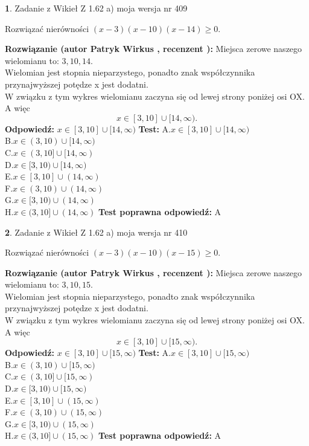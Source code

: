 \documentclass[12pt, a4paper]{article}
\theoremstyle{definition} %
\newtheorem{zad}{}
\newcommand{\zadStart}[1]{\begin{zad}#1\newline}
\newcommand{\zadStop}{\end{zad}}
\newcommand{\rozwStart}[2]{\noindent \textbf{Rozwiązanie (autor #1 , recenzent #2): }\newline}
\newcommand{\rozwStop}{\newline}
\newcommand{\odpStart}{\noindent \textbf{Odpowiedź:}\newline}
\newcommand{\odpStop}{\newline}
\newcommand{\testStart}{\noindent \textbf{Test:}\newline}
\newcommand{\testStop}{\newline}
\newcommand{\kluczStart}{\noindent \textbf{Test poprawna odpowiedź:}\newline}
\newcommand{\kluczStop}{\newline}
\begin{document}
\zadStart{Zadanie z Wikieł Z 1.62 a) moja wersja nr 409}

Rozwiązać nierówności $(x-3)(x-10)(x-14)\ge0$.
\zadStop
\rozwStart{Patryk Wirkus}{}
Miejsca zerowe naszego wielomianu to: $3, 10, 14$.\\
Wielomian jest stopnia nieparzystego, ponadto znak współczynnika przy\linebreak najwyższej potędze x jest dodatni.\\ W związku z tym wykres wielomianu zaczyna się od lewej strony poniżej osi OX. A więc $$x \in [3,10] \cup [14,\infty).$$
\rozwStop
\odpStart
$x \in [3,10] \cup [14,\infty)$
\odpStop
\testStart
A.$x \in [3,10] \cup [14,\infty)$\\
B.$x \in (3,10) \cup [14,\infty)$\\
C.$x \in (3,10] \cup [14,\infty)$\\
D.$x \in [3,10) \cup [14,\infty)$\\
E.$x \in [3,10] \cup (14,\infty)$\\
F.$x \in (3,10) \cup (14,\infty)$\\
G.$x \in [3,10) \cup (14,\infty)$\\
H.$x \in (3,10] \cup (14,\infty)$
\testStop
\kluczStart
A
\kluczStop



\zadStart{Zadanie z Wikieł Z 1.62 a) moja wersja nr 410}

Rozwiązać nierówności $(x-3)(x-10)(x-15)\ge0$.
\zadStop
\rozwStart{Patryk Wirkus}{}
Miejsca zerowe naszego wielomianu to: $3, 10, 15$.\\
Wielomian jest stopnia nieparzystego, ponadto znak współczynnika przy\linebreak najwyższej potędze x jest dodatni.\\ W związku z tym wykres wielomianu zaczyna się od lewej strony poniżej osi OX. A więc $$x \in [3,10] \cup [15,\infty).$$
\rozwStop
\odpStart
$x \in [3,10] \cup [15,\infty)$
\odpStop
\testStart
A.$x \in [3,10] \cup [15,\infty)$\\
B.$x \in (3,10) \cup [15,\infty)$\\
C.$x \in (3,10] \cup [15,\infty)$\\
D.$x \in [3,10) \cup [15,\infty)$\\
E.$x \in [3,10] \cup (15,\infty)$\\
F.$x \in (3,10) \cup (15,\infty)$\\
G.$x \in [3,10) \cup (15,\infty)$\\
H.$x \in (3,10] \cup (15,\infty)$
\testStop
\kluczStart
A
\kluczStop
\end{document}
